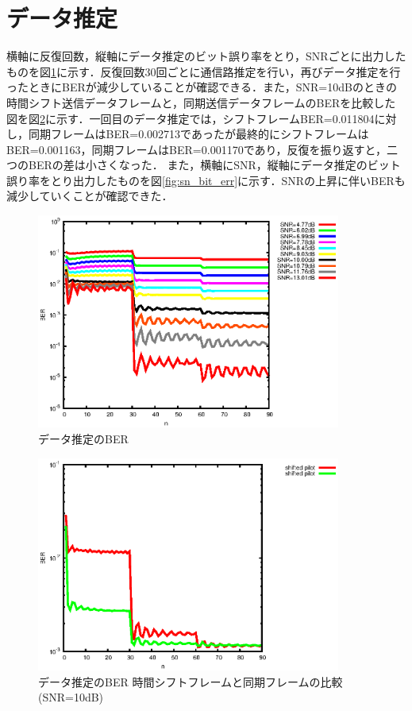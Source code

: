 \section{データ推定}
横軸に反復回数，縦軸にデータ推定のビット誤り率をとり，SNRごとに出力したものを図\ref{fig:bit_err}に示す．反復回数30回ごとに通信路推定を行い，再びデータ推定を行ったときにBERが減少していることが確認できる．また，SNR=10dBのときの時間シフト送信データフレームと，同期送信データフレームのBERを比較した図を図\ref{fig:bit_err_comparison}に示す．一回目のデータ推定では，シフトフレームBER=0.011804に対し，同期フレームはBER=0.002713であったが最終的にシフトフレームはBER=0.001163，同期フレームはBER=0.001170であり，反復を振り返すと，二つのBERの差は小さくなった．
また，横軸にSNR，縦軸にデータ推定のビット誤り率をとり出力したものを図\ref{fig:sn_bit_err}に示す．SNRの上昇に伴いBERも減少していくことが確認できた．
\begin{figure}[htbp]
  \begin{center}
    \includegraphics[clip,width=10.0cm]{./bit_err.eps}
    \caption{データ推定のBER}
    \label{fig:bit_err}
  \end{center}
\end{figure}
\begin{figure}[htbp]
  \begin{center}
    \includegraphics[clip,width=10.0cm]{bit_err_comparison.eps}
    \caption{データ推定のBER 時間シフトフレームと同期フレームの比較(SNR=10dB)}
    \label{fig:bit_err_comparison}
  \end{center}
\end{figure}
